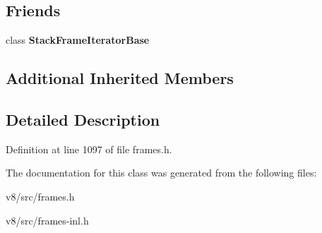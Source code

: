 \subsection*{Friends}
\begin{DoxyCompactItemize}
\item 
\mbox{\label{classv8_1_1internal_1_1ConstructFrame_ac7310421866976ca454bbe11c5f926c3}} 
class {\bfseries Stack\+Frame\+Iterator\+Base}
\end{DoxyCompactItemize}
\subsection*{Additional Inherited Members}


\subsection{Detailed Description}


Definition at line 1097 of file frames.\+h.



The documentation for this class was generated from the following files\+:\begin{DoxyCompactItemize}
\item 
v8/src/frames.\+h\item 
v8/src/frames-\/inl.\+h\end{DoxyCompactItemize}
